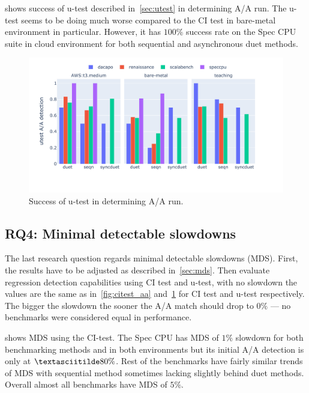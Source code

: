  shows success of \mbox{u-test} described in~\cref{sec:utest} in determining A/A run.
The \mbox{u-test} seems to be doing much worse compared to the CI test in bare-metal environment in particular.
However, it has $100\%$ success rate on the Spec CPU suite in cloud environment for both sequential and asynchronous duet methods.

\begin{figure}
	\centering
	\includegraphics[width=1\linewidth]{./figures/utest_aa_match.pdf}
	\caption{
		Success of \mbox{u-test} in determining A/A run.
	}
	\label{fig:utest_aa}
\end{figure}

\subsection{RQ4: Minimal detectable slowdowns}
\label{sec:rq4}

The last research question regards minimal detectable slowdowns (MDS).
First, the results have to be adjusted as described in~\cref{sec:mds}.
Then evaluate regression detection capabilities using CI test and \mbox{u-test}, with no slowdown the values are the same as in~\cref{fig:citest_aa} and~\cref{fig:utest_aa} for CI test and \mbox{u-test} respectively.
The bigger the slowdown the sooner the A/A match should drop to $0\%$ --- no benchmarks were considered equal in performance.

 shows MDS using the CI-test.
The Spec CPU has MDS of $1\%$ slowdown for both benchmarking methods and in both environments but its initial A/A detection is only at $\textasciitilde 80\%$.
Rest of the benchmarks have fairly similar trends of MDS with sequential method sometimes lacking slightly behind duet methods.
Overall almost all benchmarks have MDS of $5\%$.

